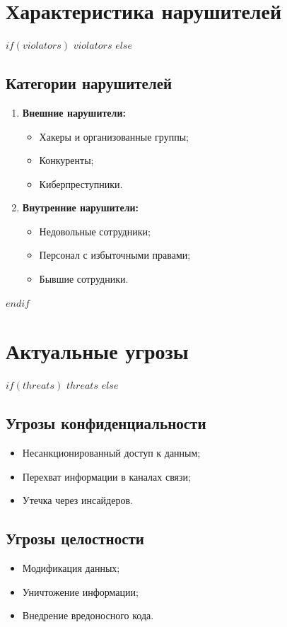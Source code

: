\documentclass[14pt,a4paper]{extarticle}
\begin{document}
\section{Характеристика нарушителей}
\label{sec:violators}

$if(violators)$
$violators$
$else$
\subsection{Категории нарушителей}
\begin{enumerate}
    \item \textbf{Внешние нарушители:}
    \begin{itemize}
        \item Хакеры и организованные группы;
        \item Конкуренты;
        \item Киберпреступники.
    \end{itemize}
    
    \item \textbf{Внутренние нарушители:}
    \begin{itemize}
        \item Недовольные сотрудники;
        \item Персонал с избыточными правами;
        \item Бывшие сотрудники.
    \end{itemize}
\end{enumerate}
$endif$

\section{Актуальные угрозы}
\label{sec:threats}

$if(threats)$
$threats$
$else$
\subsection{Угрозы конфиденциальности}
\begin{itemize}
    \item Несанкционированный доступ к данным;
    \item Перехват информации в каналах связи;
    \item Утечка через инсайдеров.
\end{itemize}

\subsection{Угрозы целостности}
\begin{itemize}
    \item Модификация данных;
    \item Уничтожение информации;
    \item Внедрение вредоносного кода.
\end{itemize}
\end{document}
